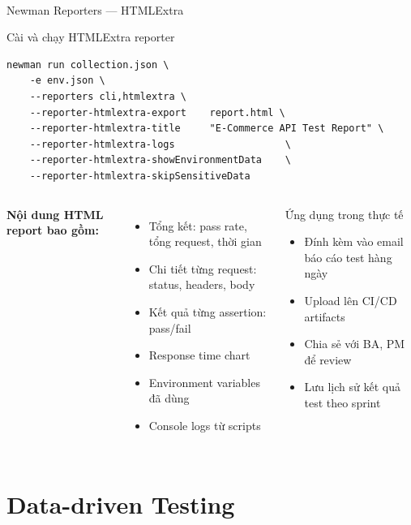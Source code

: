 \documentclass[aspectratio=169,10pt]{beamer}
\newcommand{\sref}[1]{\textsuperscript{\scriptsize\cite{#1}}}
\begin{document}
\begin{frame}[fragile]{Newman Reporters --- HTMLExtra\sref{newman-htmlextra}}
  \begin{block}{Cài và chạy HTMLExtra reporter}
\begin{lstlisting}[style=bash]
newman run collection.json \
    -e env.json \
    --reporters cli,htmlextra \
    --reporter-htmlextra-export    report.html \
    --reporter-htmlextra-title     "E-Commerce API Test Report" \
    --reporter-htmlextra-logs                   \
    --reporter-htmlextra-showEnvironmentData    \
    --reporter-htmlextra-skipSensitiveData
\end{lstlisting}
  \end{block}

  \vspace{0.3em}
  \begin{columns}
    \column{0.5\textwidth}
    \textbf{Nội dung HTML report bao gồm:}
    \begin{itemize}
      \item Tổng kết: pass rate, tổng request, thời gian
      \item Chi tiết từng request: status, headers, body
      \item Kết quả từng assertion: pass/fail
      \item Response time chart
      \item Environment variables đã dùng
      \item Console logs từ scripts
    \end{itemize}

    \column{0.5\textwidth}
    \begin{exampleblock}{Ứng dụng trong thực tế}
      \begin{itemize}
        \item Đính kèm vào email báo cáo test hàng ngày
        \item Upload lên CI/CD artifacts
        \item Chia sẻ với BA, PM để review
        \item Lưu lịch sử kết quả test theo sprint
      \end{itemize}
    \end{exampleblock}
  \end{columns}
\end{frame}

\section{Data-driven Testing}
\end{document}

